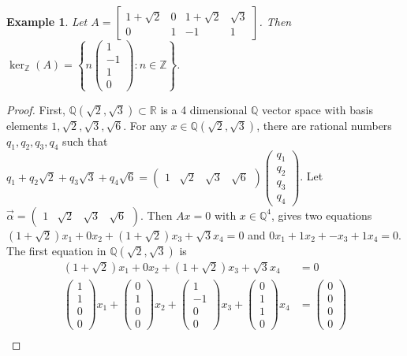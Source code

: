 \documentclass{article}
\newcommand{\Z}[0]{\mathbb{Z}}		%
\newcommand{\Q}[0]{\mathbb{Q}}		%
\newcommand{\R}[0]{\mathbb{R}}		%
\newtheorem{ex}[thm]{Example}
\theoremstyle{definition}
\theoremstyle{remark}
\begin{document}
\begin{ex}\label{DimDiff}
Let $A = \begin{bmatrix}1+\sqrt{2} & 0 & 1+\sqrt{2} & \sqrt{3} \\ 0 & 1 & -1 &1\end{bmatrix}$. Then $\ker_\Z(A) = \left\{n\begin{pmatrix} 1\\ -1\\ 1\\ 0\end{pmatrix}: n\in \Z\right\}$. 
\end{ex}
\begin{proof}
First, $\Q(\sqrt{2},\sqrt{3})\subset \R$ is a  4 dimensional $\Q$ vector space with basis elements $1,\sqrt{2},\sqrt{3},\sqrt{6}$. For any $x\in \Q(\sqrt{2},\sqrt{3})$, there are rational numbers $q_1,q_2,q_3,q_4$ such that $q_1+q_2\sqrt{2} +q_3\sqrt{3} +q_4\sqrt{6} = \begin{pmatrix}1& \sqrt{2} & \sqrt{3} & \sqrt{6} \end{pmatrix}\begin{pmatrix} q_1\\ q_2\\q_3\\q_4\end{pmatrix}$.  Let $\vec{\alpha} = \begin{pmatrix}1& \sqrt{2} & \sqrt{3} & \sqrt{6} \end{pmatrix}$. Then $Ax = 0$ with $x\in \Q^4$, gives two equations $(1+\sqrt{2}) x_1 + 0 x_2 + (1+\sqrt{2}) x_3 + \sqrt{3}x_4 = 0$ and  $0x_1 + 1 x_2 + - x_3 + 1x_4 = 0$. The first equation in $\Q(\sqrt{2},\sqrt{3})$ is \begin{align}
    (1+\sqrt{2}) x_1 + 0 x_2 + (1+\sqrt{2}) x_3 + \sqrt{3}x_4 &= 0\\ 
     \begin{pmatrix}1\\1\\0\\0\end{pmatrix} x_1 +\begin{pmatrix}0\\1\\0\\0\end{pmatrix} x_2+  \begin{pmatrix}1\\-1\\0\\0\end{pmatrix} x_3+  \begin{pmatrix}0\\1\\1\\0\end{pmatrix} x_4& =\begin{pmatrix}0\\0\\0\\0\end{pmatrix} \\ 

\end{align}
\end{proof}
\end{document}
